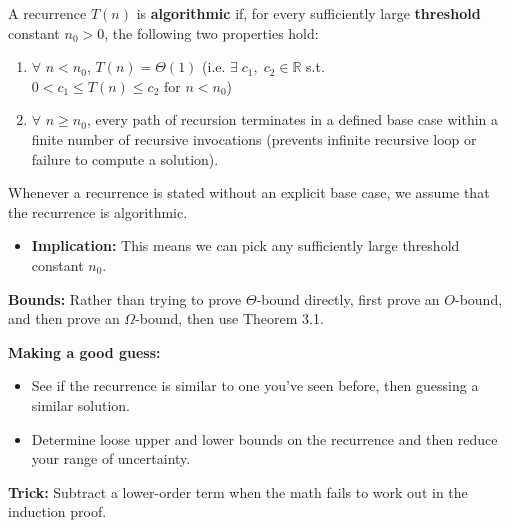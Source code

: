 A recurrence $T(n)$ is \textbf{algorithmic} if, for every sufficiently large \textbf{threshold} constant $n_0 >0$, the following two properties hold:
\begin{enumerate}
    \item $\forall$ $n<n_0$, $T(n) = \Theta(1)$ (i.e. $\exists \; c_1, \; c_2 \in \mathbb{R}$ s.t. $0<c_1\leq T(n) \leq c_2 \text{ for } n<n_0$)
    \item $\forall$ $n \geq n_0$, every path of recursion terminates in a defined base case within a finite number of recursive invocations (prevents infinite recursive loop or failure to compute a solution).
\end{enumerate}

\begin{intuition}
    Whenever a recurrence is stated without an explicit base case, we assume that the recurrence is algorithmic.
    \begin{itemize}
        \item \textbf{Implication:} This means we can pick any sufficiently large threshold constant $n_0$.
    \end{itemize}
\end{intuition}

\item \textbf{Bounds:} Rather than trying to prove $\Theta$-bound directly, first prove an $O$-bound, and then prove an $\Omega$-bound, then use Theorem 3.1.
            \item \textbf{Making a good guess:}
            \begin{itemize}
                \item See if the recurrence is similar to one you've seen before, then guessing a similar solution.
                \item Determine loose upper and lower bounds on the recurrence and then reduce your range of uncertainty.
            \end{itemize}
            \item \textbf{Trick:} Subtract a lower-order term when the math fails to work out in the induction proof.